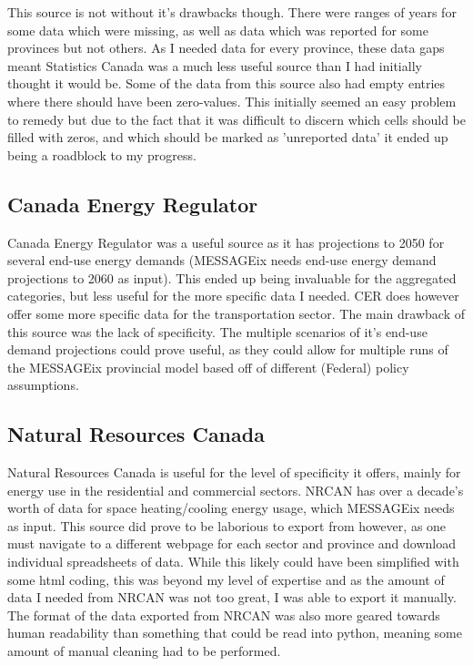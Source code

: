\documentclass{article}
\begin{document}
This source is not without it's drawbacks though. There were ranges of years for some data which were missing, as well as data which was reported for some provinces but not others. As I needed data for every province, these data gaps meant Statistics Canada was a much less useful source than I had initially thought it would be. Some of the data from this source also had empty entries where there should have been zero-values. This initially seemed an easy problem to remedy but due to the fact that it was difficult to discern which cells should be filled with zeros, and which should be marked as 'unreported data' it ended up being a roadblock to my progress.

\subsection{Canada Energy Regulator}

Canada Energy Regulator was a useful source as it has projections to 2050 for several end-use energy demands (MESSAGEix needs end-use energy demand projections to 2060 as input). This ended up being invaluable for the aggregated categories, but less useful for the more specific data I needed. CER does however offer some more specific data for the transportation sector. The main drawback of this source was the lack of specificity. The multiple scenarios of it's end-use demand projections could prove useful, as they could allow for multiple runs of the MESSAGEix provincial model based off of different (Federal) policy assumptions.

\subsection{Natural Resources Canada}

Natural Resources Canada is useful for the level of specificity it offers, mainly for energy use in the residential and commercial sectors. NRCAN has over a decade's worth of data for space heating/cooling energy usage, which MESSAGEix needs as input. This source did prove to be laborious to export from however, as one must navigate to a different webpage for each sector and province and download individual spreadsheets of data. While this likely could have been simplified with some html coding, this was beyond my level of expertise and as the amount of data I needed from NRCAN was not too great, I was able to export it manually. The format of the data exported from NRCAN was also more geared towards human readability than something that could be read into python, meaning some amount of manual cleaning had to be performed.
\end{document}
